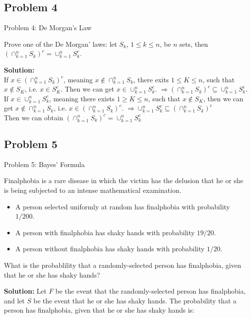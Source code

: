 \documentclass{beamer}
\begin{document}
\subsection{Problem 4}
\begin{frame}{Problem 4: De Morgan's Law}
\begin{block}{}
Prove one of the De Morgan' laws: let $S_k$, $1\leq k\leq n$, be $n$ sets, then $\left(\cap_{k=1}^n S_k\right)^c = \cup_{k=1}^n S^c_k$.\\
\end{block}
\vspace{0.3cm}
\textbf{Solution:}\\\vspace{0.2cm}
If $x\in (\cap_{k=1}^nS_k)^c$, meaning $x\notin \cap_{k=1}^nS_k$, there exits $1\leq K\leq n$, such that $x\notin S_K$, i.e. $x\in S_K^c$. Then we can get $x\in \cup_{k=1}^nS_k^c$. $\Rightarrow (\cap_{k=1}^nS_k)^c \subseteq \cup_{k=1}^nS_k^c$.\\
\vspace{0.2cm}
If $x\in \cup_{k=1}^nS_k^c$, meaning there exists $1\geq K\leq n$, such that $x\notin S_K$, then we can get $x\notin \cap_{k=1}^nS_k$, i.e. $x\in (\cap_{k=1}^nS_k)^c$. $\Rightarrow  \cup_{k=1}^nS_k^c \subseteq (\cap_{k=1}^nS_k)^c$\\
\vspace{0.2cm}
Then we can obtain $(\cap_{k=1}^nS_k)^c = \cup_{k=1}^nS_k^c$
\end{frame}

\subsection{Problem 5}
\begin{frame}{Problem 5: Bayes' Formula}
    \begin{block}{}
    Finalphobia is a rare disease in which the victim has the delusion that he or she is being subjected to an intense mathematical examination. 
    \begin{itemize}
        \item A person selected uniformly at random has finalphobia with probability $1/200$.
        \item A person with finalphobia has shaky hands with probability $19/20$. 
        \item A person without finalphobia has shaky hands with probability $1/20$. 
    \end{itemize}
    What is the probablility that a randomly-selected person has finalphobia, given that he or she has shaky hands? \\
    \end{block}
    \vspace{0.3cm}
    \textbf{Solution:} Let $F$ be the event that the randomly-selected person has finalphobia, and let $S$ be the event that he or she has shaky hands. The probability that a person has finalphobia, given that he or she has shaky hands is: 
\end{frame}
\end{document}
